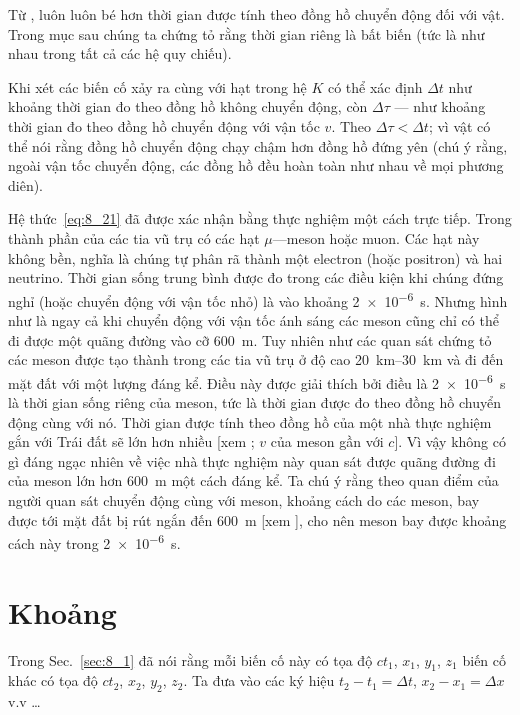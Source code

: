 Từ , luôn luôn bé hơn thời gian được tính theo đồng hồ chuyển động đối với vật. Trong mục sau chúng ta chứng tỏ rằng thời gian riêng là bất biến (tức là như nhau trong tất cả các hệ quy chiếu).

Khi xét các biến cố xảy ra cùng với hạt trong hệ $K$ có thể xác định $\Delta t$ như khoảng thời gian đo theo đồng hồ không chuyển động, còn $\Delta\tau$ --- như khoảng thời gian đo theo đồng hồ chuyển động với vận tốc $v$. Theo  $\Delta\tau<\Delta t$; vì vật có thể nói rằng đồng hồ chuyển động chạy chậm hơn đồng hồ đứng yên (chú ý rằng, ngoài vận tốc chuyển động, các đồng hồ đều hoàn toàn như nhau về mọi phương diên).

Hệ thức~\eqref{eq:8_21} đã được xác nhận bằng thực nghiệm một cách trực tiếp. Trong thành phần của các tia vũ trụ có các hạt $\mu$---meson hoặc muon. Các hạt này không bền, nghĩa là chúng tự phân rã thành một electron (hoặc positron) và hai neutrino. Thời gian sống trung bình được đo trong các điều kiện khi chúng đứng nghỉ (hoặc chuyển động với vận tốc nhỏ) là vào khoảng \SI{2e-6}{\second}. Nhưng hình như là ngay cả khi chuyển động với vận tốc ánh sáng các meson cũng chỉ có thể đi được một quãng đường vào cỡ \SI{600}{\metre}. Tuy nhiên như các quan sát chứng tỏ các meson được tạo thành trong các tia vũ trụ ở độ cao \SIrange{20}{30}{\kilo\metre} và đi đến mặt đất với một lượng đáng kể. Điều này được giải thích bởi điều là \SI{2e-6}{\second} là thời gian sống riêng của meson, tức là thời gian được đo theo đồng hồ chuyển động cùng với nó. Thời gian được tính theo đồng hồ của một nhà thực nghiệm gắn với Trái đất sẽ lớn hơn nhiều [xem ; $v$ của meson gần với $c$]. Vì vậy không có gì đáng ngạc nhiên về việc nhà thực nghiệm này quan sát được quãng đường đi của meson lớn hơn \SI{600}{\metre} một cách đáng kể. Ta chú ý rằng theo quan điểm của người quan sát chuyển động cùng với meson, khoảng cách do các meson, bay được tới mặt đất bị rút ngắn đến \SI{600}{\metre} [xem ], cho nên meson bay được khoảng cách này trong \SI{2e-6}{\second}.

\section{Khoảng}\label{sec:8_4}

Trong Sec.~\ref{sec:8_1} đã nói rằng mỗi biến cố này có tọa độ $ct_1$, $x_1$, $y_1$, $z_1$ biến cố khác có tọa độ $ct_2$, $x_2$, $y_2$, $z_2$. Ta đưa vào các ký hiệu $t_2-t_1=\Delta t$, $x_2-x_1=\Delta x$ v.v \ldots

